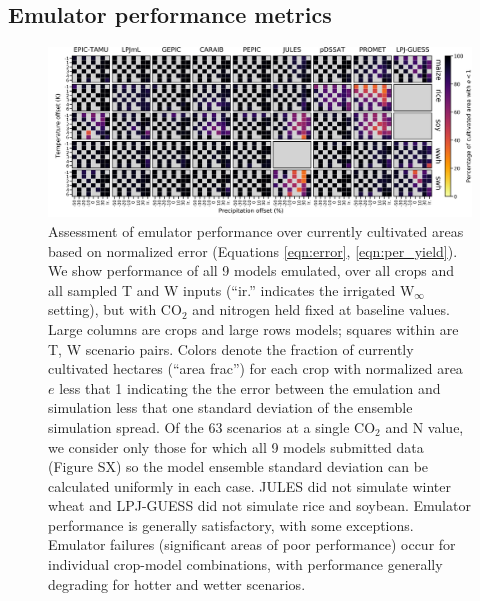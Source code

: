 \documentclass[gmd, manuscript]{copernicus} %
\begin{document}
\subsection{Emulator performance metrics}
\begin{figure}[ht]
\centering
    \includegraphics[width=16cm]{figures/error_grid.png}
    \caption{
    Assessment of emulator performance over currently cultivated areas based on normalized error (Equations \ref{eqn:error}, \ref{eqn:per_yield}). 
    We show performance of all 9 models emulated, over all crops and all sampled T and W inputs (``ir.'' indicates the irrigated W$_{\infty}$ setting), but with CO$_2$ and nitrogen held fixed at baseline values. 
    Large columns are crops and large rows models; squares within are T, W scenario pairs. 
    Colors denote the fraction of currently cultivated hectares (``area frac'') for each crop with normalized area $e$ less that 1 indicating the the error between the emulation and simulation less that one standard deviation of the ensemble simulation spread. 
    Of the 63 scenarios at a single CO$_2$ and N value, we consider only those for which all 9 models submitted data (Figure SX) so the model ensemble standard deviation can be calculated uniformly in each case. 
    JULES did not simulate winter wheat and LPJ-GUESS did not simulate rice and soybean. Emulator performance is generally satisfactory, with some exceptions. 
    Emulator failures (significant areas of poor performance) occur for individual crop-model combinations, with performance generally degrading for hotter and wetter scenarios.
    }
   \label{fig:error_360}
\end{figure}
\end{document}
